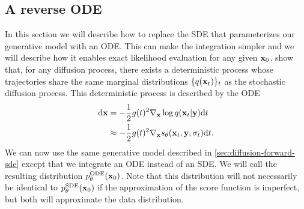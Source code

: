 
\subsection{A reverse ODE} \label{sec:diffusion-ode}
In this section we will describe how to replace the SDE that parameterizes our generative model with an ODE. This can make the integration simpler and we will describe how it enables exact likelihood evaluation for any given ${\mathbf{x}}_0$.  \citet{song2020score} show that, for any diffusion process, there exists a deterministic process whose trajectories share the same marginal distributions $\{q({\mathbf{x}}_t)\}_t$ as the stochastic diffusion process. This deterministic process is described by the ODE
\begin{align}
    \mathrm{d}{\mathbf{x}} &= - \frac{1}{2} g(t)^2 \nabla_{\mathbf{x}} \log q({\mathbf{x}}_t|{\mathbf{y}}) \mathrm{d}t \\
    &\approx - \frac{1}{2} g(t)^2 \nabla_{\mathbf{x}} s_\theta({\mathbf{x}}_t, {\mathbf{y}}, \sigma_t) \mathrm{d}t. \label{eq:diffusion-ode-with-nn}
\end{align}
We can now use the same generative model described in \cref{sec:diffusion-forward-sde} except that we integrate an ODE instead of an SDE. We will call the resulting distribution $p_\theta^\text{ODE}({\mathbf{x}}_0)$. Note that this distribution will not necessarily be identical to $p_\theta^\text{SDE}({\mathbf{x}}_0)$ if the approximation of the score function is imperfect, but both will approximate the data distribution.

